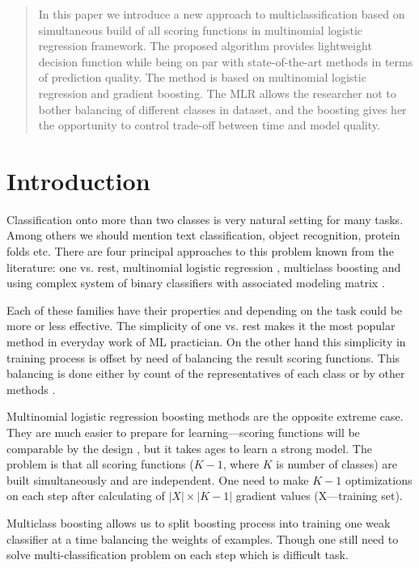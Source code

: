 \documentclass{article}
\begin{document}
\begin{abstract} 
In this paper we introduce a new approach to multiclassification based on simultaneous build of all scoring functions in multinomial logistic regression framework. The proposed algorithm provides lightweight decision function while being on par with state-of-the-art methods in terms of prediction quality. The method is based on multinomial logistic regression and gradient boosting. The MLR allows the researcher not to bother balancing of different classes in dataset, and the boosting gives her the opportunity to control trade-off between time and model quality.
\end{abstract} 

\section{Introduction}
\label{introduction}
Classification onto more than two classes is very natural setting for many tasks. Among others we should mention text classification, object recognition, protein folds etc. There are four principal approaches to this problem known from the literature: one vs. rest, multinomial logistic regression \cite{GLM}, multiclass boosting \cite{journals/jmlr/MukherjeeS13} and using complex system of binary classifiers with associated modeling matrix \cite{Allwein00reducingmulticlass}.

Each of these families have their properties and depending on the task could be more or less effective. The simplicity of one vs. rest makes it the most popular method in everyday work of ML practician. On the other hand this simplicity in training process is offset by need of balancing the result scoring functions. This balancing is done either by count of the representatives of each class or by other methods \cite{imbalancing_classes1,imbalancing_classes2}.

Multinomial logistic regression boosting methods are the opposite extreme case. They are much easier to prepare for learning---scoring functions will be comparable by the design \cite{mlr_imbalancing}, but it takes ages to learn a strong model. The problem is that all scoring functions ($K-1$, where $K$ is number of classes) are built simultaneously and are independent. One need to make $K-1$ optimizations on each step after calculating of $|X|\times |K - 1|$ gradient values (X---training set).

Multiclass boosting allows us to split boosting process into training one weak classifier at a time balancing the weights of examples. Though one still need to solve multi-classification problem on each step which is difficult task. 
\end{document}
